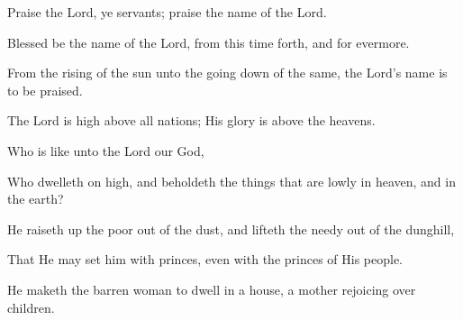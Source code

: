 Praise the Lord, ye servants; praise the name of the Lord.

Blessed be the name of the Lord, from this time forth, and for evermore.

From the rising of the sun unto the going down of the same, the Lord’s name is to be praised.

The Lord is high above all nations; His glory is above the heavens.

Who is like unto the Lord our God,

Who dwelleth on high, and beholdeth the things that are lowly in heaven, and in the earth?

He raiseth up the poor out of the dust, and lifteth the needy out of the dunghill,

That He may set him with princes, even with the princes of His people.

He maketh the barren woman to dwell in a house, a mother rejoicing over children.
